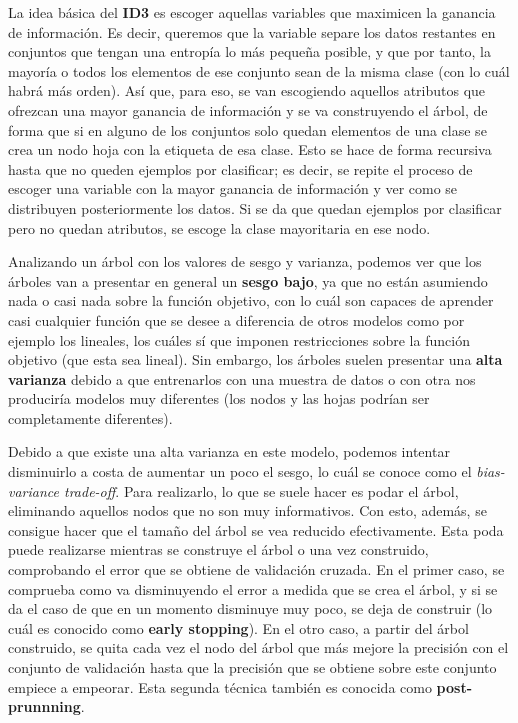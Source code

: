 \documentclass[11pt,a4paper]{article}
\begin{document}
La idea básica del \textbf{ID3} es escoger aquellas variables que maximicen la ganancia de información. Es decir, queremos
que la variable separe los datos restantes en conjuntos que tengan una entropía lo más pequeña posible, y que por tanto, la mayoría o
todos los elementos de ese conjunto sean de la misma clase (con lo cuál habrá más orden). Así que, para eso, se van escogiendo
aquellos atributos que ofrezcan una mayor ganancia de información y se va construyendo el árbol, de forma que si en alguno de los
conjuntos solo quedan elementos de una clase se crea un nodo hoja con la etiqueta de esa clase. Esto se hace de forma recursiva hasta
que no queden ejemplos por clasificar; es decir, se repite el proceso de escoger una variable con la mayor ganancia de información
y ver como se distribuyen posteriormente los datos. Si se da que quedan ejemplos por clasificar pero no quedan atributos, se escoge
la clase mayoritaria en ese nodo.

Analizando un árbol con los valores de sesgo y varianza, podemos ver que los árboles van a presentar en general un \textbf{sesgo
bajo}, ya que no están asumiendo nada o casi nada sobre la función objetivo, con lo cuál son capaces de aprender casi cualquier
función que se desee a diferencia de otros modelos como por ejemplo los lineales, los cuáles sí que imponen restricciones sobre la
función objetivo (que esta sea lineal). Sin embargo, los árboles suelen presentar una \textbf{alta varianza} debido a que entrenarlos
con una muestra de datos o con otra nos produciría modelos muy diferentes (los nodos y las hojas podrían ser completamente
diferentes).

Debido a que existe una alta varianza en este modelo, podemos intentar disminuirlo a costa de aumentar un poco el sesgo, lo cuál se
conoce como el \textit{bias-variance trade-off}. Para realizarlo, lo que se suele hacer es podar el árbol, eliminando aquellos nodos
que no son muy informativos. Con esto, además, se consigue hacer que el tamaño del árbol se vea reducido efectivamente. Esta poda
puede realizarse mientras se construye el árbol o una vez construido, comprobando el error que se obtiene de validación cruzada. En
el primer caso, se comprueba como va disminuyendo el error a medida que se crea el árbol, y si se da el caso de que en un momento
disminuye muy poco, se deja de construir (lo cuál es conocido como \textbf{early stopping}). En el otro caso, a partir del árbol
construido, se quita cada vez el nodo del árbol que más mejore la precisión con el conjunto de validación hasta que la precisión
que se obtiene sobre este conjunto empiece a empeorar. Esta segunda técnica también es conocida como \textbf{post-prunnning}.
\end{document}
